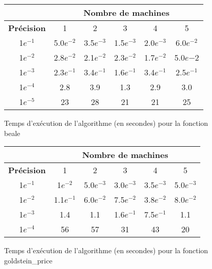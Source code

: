     \begin{figure}[!h]
        \begin{center}
            \begin{tabular}{|c|c|c|c|c|c|}
            \hline
                 & \multicolumn{5}{c|}{\textbf{Nombre de machines}} \\ \hline
                \textbf{Précision} & 1 & 2 & 3 & 4 & 5 \\ \hline
                1$e^{-1}$ & 5.0$e^{-2}$ & 3.5$e^{-3}$ & 1.5$e^{-3}$ & 2.0$e^{-3}$ & 6.0$e^{-2}$ \\ \hline
                1$e^{-2}$ & 2.8$e^{-2}$ & 2.1$e^{-2}$ & 2.3$e^{-2}$ & 1.7$e^{-2}$ & 5.0$e{-2}$ \\ \hline
                1$e^{-3}$ & 2.3$e^{-1}$ & 3.4$e^{-1}$ & 1.6$e^{-1}$ & 3.4$e^{-1}$ & 2.5$e^{-1}$ \\ \hline
                1$e^{-4}$ & 2.8 & 3.9 & 1.3 & 2.9 & 3.0 \\ \hline
                1$e^{-5}$ & 23 & 28 & 21 & 21 & 25 \\ \hline
            \end{tabular}
            \caption{Temps d'exécution de l'algorithme (en secondes) pour la fonction beale}
            \label{tab:mpi-beale}
        \end{center}
    \end{figure}
    
    \begin{figure}[!h]
        \begin{center}
            \begin{tabular}{|c|c|c|c|c|c|}
            \hline
                 & \multicolumn{5}{c|}{\textbf{Nombre de machines}} \\ \hline
                \textbf{Précision} & 1 & 2 & 3 & 4 & 5 \\ \hline
                1$e^{-1}$ & 1$e^{-2}$ & 5.0$e^{-3}$ & 3.0$e^{-3}$ & 3.5$e^{-3}$ & 5.0$e^{-3}$ \\ \hline
                1$e^{-2}$ & 1.1$e^{-1}$ & 6.0$e^{-2}$ & 7.5$e^{-2}$ & 3.8$e^{-2}$ & 8.0$e^{-2}$ \\ \hline
                1$e^{-3}$ & 1.4 & 1.1 & 1.6$e^{-1}$ & 7.5$e^{-1}$ & 1.1 \\ \hline
                1$e^{-4}$ & 56 & 57 & 31 & 43 & 20 \\ \hline
            \end{tabular}
            \caption{Temps d'exécution de l'algorithme (en secondes) pour la fonction goldstein\_price}
            \label{tab:mpi-goldstein-price}
        \end{center}
    \end{figure}
    
